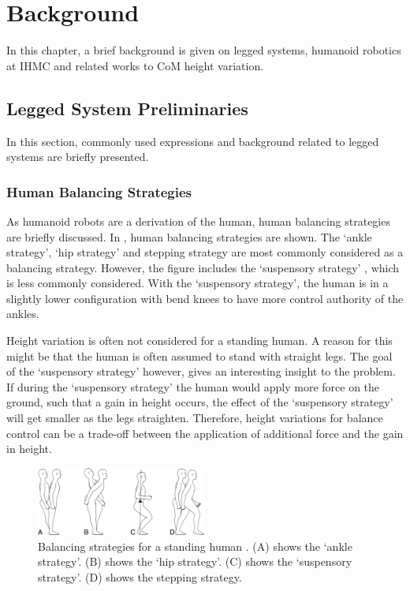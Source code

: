%
\chapter{Background}\label{chap:background}
In this chapter, a brief background is given on legged systems, humanoid robotics at \ac{IHMC} and related works to \ac{CoM} height variation.
\section{Legged System Preliminaries}
In this section, commonly used expressions and background related to legged systems are briefly presented.
\subsection{Human Balancing Strategies}
As humanoid robots are a derivation of the human, human balancing strategies are briefly discussed. In , human balancing strategies are shown. The `ankle strategy', `hip strategy' and stepping strategy are most commonly considered as a balancing strategy. However, the figure includes the `suspensory strategy' \cite{hasson1994clinical}, which is less commonly considered. With the `suspensory strategy', the human is in a slightly lower configuration with bend knees to have more control authority of the ankles.

Height variation is often not considered for a standing human. A reason for this might be that the human is often assumed to stand with straight legs. The goal of the `suspensory strategy' however, gives an interesting insight to the problem. If during the `suspensory strategy' the human would apply more force on the ground, such that a gain in height occurs, the effect of the `suspensory strategy' will get smaller as the legs straighten. Therefore, height variations for balance control can be a trade-off between the application of additional force and the gain in height. 
\begin{figure}
\centering
\includegraphics[width=0.5\textwidth]{STYLESTUFF/humanbalance.jpg}
\caption{Balancing strategies for a standing human \cite{hasson1994clinical}. (A) shows the `ankle strategy'. (B) shows the `hip strategy'. (C) shows the `suspensory strategy'. (D) shows the stepping strategy.}
\label{fig:human}
\end{figure}
